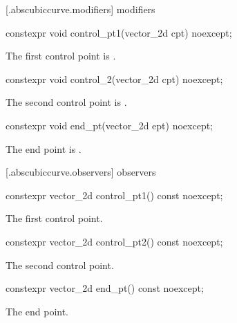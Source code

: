  [\iotwod.abscubiccurve.modifiers]{ modifiers}

%
\begin{itemdecl}
constexpr void control_pt1(vector_2d cpt) noexcept;
\end{itemdecl}
\begin{itemdescr}
\pnum
\effects
The first control point is .
\end{itemdescr}

%
\begin{itemdecl}
constexpr void control_2(vector_2d cpt) noexcept;
\end{itemdecl}
\begin{itemdescr}
\pnum
\effects
The second control point is .
\end{itemdescr}

%
\begin{itemdecl}
constexpr void end_pt(vector_2d ept) noexcept;
\end{itemdecl}
\begin{itemdescr}
\pnum
\effects
The end point is .
\end{itemdescr}

 [\iotwod.abscubiccurve.observers]{ observers}

%
\begin{itemdecl}
constexpr vector_2d control_pt1() const noexcept;
\end{itemdecl}
\begin{itemdescr}
\pnum
\returns
The first control point.
\end{itemdescr}

%
\begin{itemdecl}
constexpr vector_2d control_pt2() const noexcept;
\end{itemdecl}
\begin{itemdescr}
\pnum
\returns
The second control point.
\end{itemdescr}

%
\begin{itemdecl}
constexpr vector_2d end_pt() const noexcept;
\end{itemdecl}
\begin{itemdescr}
\pnum
\returns
The end point.
\end{itemdescr}

